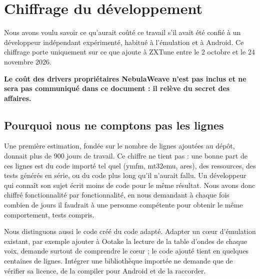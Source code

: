 \chapter{Chiffrage du développement}\label{chap:chiffrage}

Nous avons voulu savoir ce qu'aurait coûté ce travail s'il avait été confié à un développeur indépendant
expérimenté, habitué à l'émulation et à Android. Ce chiffrage porte uniquement sur ce que \soft ajoute à ZXTune
entre le 2 octobre et le 24 novembre 2026.

\textbf{Le coût des drivers propriétaires NebulaWeave n'est pas inclus et ne sera pas communiqué dans ce document :
il relève du secret des affaires.}

\section{Pourquoi nous ne comptons pas les lignes}
Une première estimation, fondée sur le nombre de lignes ajoutées au dépôt, donnait plus de 900 jours de travail.
Ce chiffre ne tient pas : une bonne part de ces lignes est du code importé tel quel (ymfm, mt32emu, ares), des
ressources, des tests générés en série, ou du code plus long qu'il n'aurait fallu. Un développeur qui connaît son
sujet écrit moins de code pour le même résultat. Nous avons donc chiffré fonctionnalité par fonctionnalité, en
nous demandant à chaque fois combien de jours il faudrait à une personne compétente pour obtenir le même
comportement, tests compris.

Nous distinguons aussi le code créé du code adapté. Adapter un cœur d'émulation existant, par exemple ajouter à
Ootake la lecture de la table d'ondes de chaque voix, demande surtout de comprendre le cœur ; le code ajouté tient
en quelques centaines de lignes. Intégrer une bibliothèque importée ne demande que de vérifier sa licence, de la
compiler pour Android et de la raccorder.

